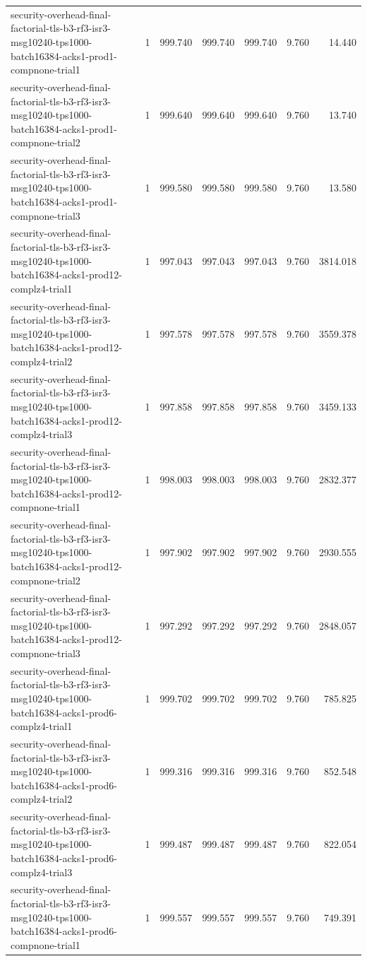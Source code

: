 \begin{tabular}{lrrrrrr}
security-overhead-final-factorial-tls-b3-rf3-isr3-msg10240-tps1000-batch16384-acks1-prod1-compnone-trial1 & 1 & 999.740 & 999.740 & 999.740 & 9.760 & 14.440 \\
security-overhead-final-factorial-tls-b3-rf3-isr3-msg10240-tps1000-batch16384-acks1-prod1-compnone-trial2 & 1 & 999.640 & 999.640 & 999.640 & 9.760 & 13.740 \\
security-overhead-final-factorial-tls-b3-rf3-isr3-msg10240-tps1000-batch16384-acks1-prod1-compnone-trial3 & 1 & 999.580 & 999.580 & 999.580 & 9.760 & 13.580 \\
security-overhead-final-factorial-tls-b3-rf3-isr3-msg10240-tps1000-batch16384-acks1-prod12-complz4-trial1 & 1 & 997.043 & 997.043 & 997.043 & 9.760 & 3814.018 \\
security-overhead-final-factorial-tls-b3-rf3-isr3-msg10240-tps1000-batch16384-acks1-prod12-complz4-trial2 & 1 & 997.578 & 997.578 & 997.578 & 9.760 & 3559.378 \\
security-overhead-final-factorial-tls-b3-rf3-isr3-msg10240-tps1000-batch16384-acks1-prod12-complz4-trial3 & 1 & 997.858 & 997.858 & 997.858 & 9.760 & 3459.133 \\
security-overhead-final-factorial-tls-b3-rf3-isr3-msg10240-tps1000-batch16384-acks1-prod12-compnone-trial1 & 1 & 998.003 & 998.003 & 998.003 & 9.760 & 2832.377 \\
security-overhead-final-factorial-tls-b3-rf3-isr3-msg10240-tps1000-batch16384-acks1-prod12-compnone-trial2 & 1 & 997.902 & 997.902 & 997.902 & 9.760 & 2930.555 \\
security-overhead-final-factorial-tls-b3-rf3-isr3-msg10240-tps1000-batch16384-acks1-prod12-compnone-trial3 & 1 & 997.292 & 997.292 & 997.292 & 9.760 & 2848.057 \\
security-overhead-final-factorial-tls-b3-rf3-isr3-msg10240-tps1000-batch16384-acks1-prod6-complz4-trial1 & 1 & 999.702 & 999.702 & 999.702 & 9.760 & 785.825 \\
security-overhead-final-factorial-tls-b3-rf3-isr3-msg10240-tps1000-batch16384-acks1-prod6-complz4-trial2 & 1 & 999.316 & 999.316 & 999.316 & 9.760 & 852.548 \\
security-overhead-final-factorial-tls-b3-rf3-isr3-msg10240-tps1000-batch16384-acks1-prod6-complz4-trial3 & 1 & 999.487 & 999.487 & 999.487 & 9.760 & 822.054 \\
security-overhead-final-factorial-tls-b3-rf3-isr3-msg10240-tps1000-batch16384-acks1-prod6-compnone-trial1 & 1 & 999.557 & 999.557 & 999.557 & 9.760 & 749.391 \\

\end{tabular}
